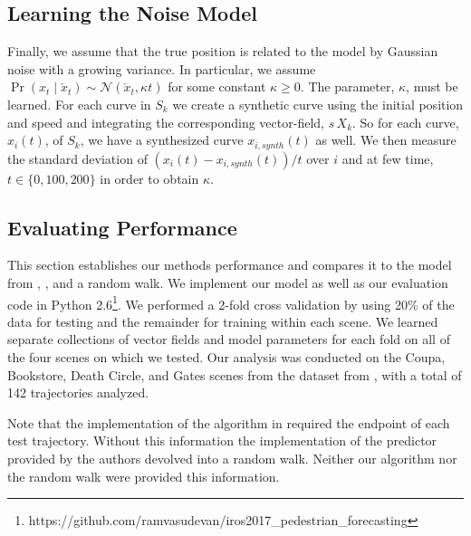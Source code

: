 \documentclass[letterpaper,10pt,conference]{ieeeconf}
\begin{document}
  \subsection{Learning the Noise Model}
  Finally, we assume that the true position is related to the model by Gaussian noise with a growing variance.
  In particular, we assume $\Pr( x_t \mid \check{x}_t) \sim \mathcal{N}( \check{x}_t , \kappa t)$ for some constant $\kappa \geq 0$.
  The parameter, $\kappa$, must be learned.
  For each curve in $S_k$ we create a synthetic curve using the initial position and speed and integrating the corresponding vector-field, $s\, X_k$.
  So for each curve, $x_i(t)$, of $S_k$, we have a synthesized curve $x_{i,synth}(t)$ as well.
  We then measure the standard deviation of $(x_i(t) - x_{i,synth}(t)) / t$ over $i$ and at few time, $t \in \{ 0, 100, 200 \}$ in order to obtain $\kappa$.
  
 \subsection{Evaluating Performance}
 
This section establishes our methods performance and compares it to the model from \cite{Kitani2012}, \cite{Alahi2016}, and a random walk.
We implement our model as well as our evaluation code in Python 2.6\footnote{https://github.com/ramvasudevan/iros2017\_pedestrian\_forecasting}.
We performed a 2-fold cross validation by using 20\% of the data for testing and the remainder for training within each scene. 
	We learned separate collections of vector fields and model parameters for each fold on all of the four scenes on which we tested.
Our analysis was conducted on the Coupa, Bookstore, Death Circle, and Gates scenes from the dataset from \cite{Robicquet2016}, with a total of 142 trajectories analyzed.



Note that the implementation of the algorithm in \cite{Kitani2012} required the endpoint of each test trajectory. 
Without this information the implementation of the predictor provided by the authors devolved into a random walk.
Neither our algorithm nor the random walk were provided this information.
\end{document}
